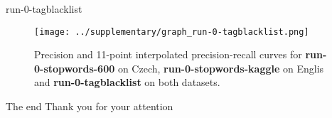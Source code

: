 \documentclass{beamer}
\newcommand{\Run}[1]{\textbf{#1}}
\let\Oldinput
\renewcommand{}[1]{\resizebox{\textwidth}{!}{\Oldinput{#1}}}
\begin{document}
\begin{frame}{run-0-tagblacklist}
\begin{table}[h]
\centering

    \caption{Results of \Run{run-0-stopwords-600} on Czech,
    \Run{run-0-stopwords-kaggle} on English and \Run{run-0-tagblacklist} on both
    datasets.\label{tbl:run-0-tagblacklist}}
\end{table}

\begin{figure}[h]
\centering
\texttt{[image: ../supplementary/graph\_run-0-tagblacklist.png]}
    \caption{Precision and 11-point interpolated precision-recall curves for
    \Run{run-0-stopwords-600} on Czech, \Run{run-0-stopwords-kaggle} on Englis
    and \Run{run-0-tagblacklist} on both
    datasets.\label{fig:run-0-tagblacklist}}
\end{figure}
\end{frame}

\begin{frame}{The end}
    \Large
    \centering
    Thank you for your attention
\end{frame}
\end{document}
